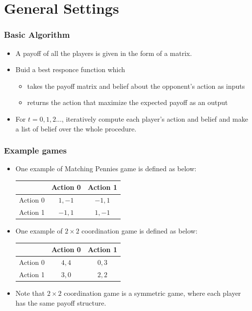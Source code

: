 \documentclass[dvipdfmx,fleqn]{beamer}
\begin{document}
\section{General Settings}

\begin{frame}
\frametitle{Basic Algorithm}
\begin{itemize}\setlength{\parskip}{0.5em}
\item
A payoff of all the players is given in the form of a matrix.

\item
Buid a best responce function which
 \begin{itemize}\setlength{\parskip}{0.5em}
 \item
 takes the payoff matrix and belief about the opponent's action as inputs

 \item
 returns the action that maximize the expected payoff as an output
 \end{itemize}
\item
For $t = 0, 1, 2...$, iteratively compute each player's action and belief and make a list of belief over the whole procedure.

\end{itemize}
\end{frame}

\begin{frame}
\frametitle{Example games}
\begin{itemize}\setlength{\parskip}{0.5em}
\item
One example of Matching Pennies game is defined as below:

 \begin{table}
 \begin{tabular}{|c|c|c|} \hline
    　 & Action 0 & Action 1 \\ \hline 
    Action 0 & $1,-1$ & $-1,1$ \\ \hline
    Action 1 & $-1,1$ & $1,-1$ \\ \hline
   \end{tabular}
  \end{table}

\item
One example of $2\times2$ coordination game is defined as below:

 \begin{table}
 \begin{tabular}{|c|c|c|} \hline
    　 & Action 0 & Action 1 \\ \hline 
    Action 0 & $4, 4$ & $0, 3$ \\ \hline
    Action 1 & $3, 0$ & $2, 2$ \\ \hline
   \end{tabular}
  \end{table}

\item
Note that $2\times2$ coordination game is a symmetric game, where each player has the same payoff structure.

\end{itemize}
\end{frame}
\end{document}
